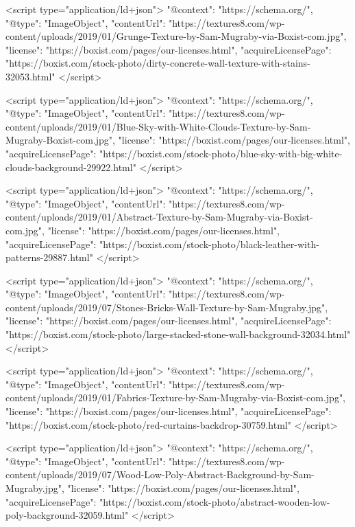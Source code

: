          <script type="application/ld+json">
    {
      "@context": "https://schema.org/",
      "@type": "ImageObject",
      "contentUrl": "https://textures8.com/wp-content/uploads/2019/01/Grunge-Texture-by-Sam-Mugraby-via-Boxist-com.jpg",
      "license": "https://boxist.com/pages/our-licenses.html",
      "acquireLicensePage": "https://boxist.com/stock-photo/dirty-concrete-wall-texture-with-stains-32053.html"
    }
    </script>
    
    
         <script type="application/ld+json">
    {
      "@context": "https://schema.org/",
      "@type": "ImageObject",
      "contentUrl": "https://textures8.com/wp-content/uploads/2019/01/Blue-Sky-with-White-Clouds-Texture-by-Sam-Mugraby-Boxist-com.jpg",
      "license": "https://boxist.com/pages/our-licenses.html",
      "acquireLicensePage": "https://boxist.com/stock-photo/blue-sky-with-big-white-clouds-background-29922.html"
    }
    </script>
    
         <script type="application/ld+json">
    {
      "@context": "https://schema.org/",
      "@type": "ImageObject",
      "contentUrl": "https://textures8.com/wp-content/uploads/2019/01/Abstract-Texture-by-Sam-Mugraby-via-Boxist-com.jpg",
      "license": "https://boxist.com/pages/our-licenses.html",
      "acquireLicensePage": "https://boxist.com/stock-photo/black-leather-with-patterns-29887.html"
    }
    </script>
    
         <script type="application/ld+json">
    {
      "@context": "https://schema.org/",
      "@type": "ImageObject",
      "contentUrl": "https://textures8.com/wp-content/uploads/2019/07/Stones-Bricks-Wall-Texture-by-Sam-Mugraby.jpg",
      "license": "https://boxist.com/pages/our-licenses.html",
      "acquireLicensePage": "https://boxist.com/stock-photo/large-stacked-stone-wall-background-32034.html"
    }
    </script>
    
         <script type="application/ld+json">
    {
      "@context": "https://schema.org/",
      "@type": "ImageObject",
      "contentUrl": "https://textures8.com/wp-content/uploads/2019/01/Fabrics-Texture-by-Sam-Mugraby-via-Boxist-com.jpg",
      "license": "https://boxist.com/pages/our-licenses.html",
      "acquireLicensePage": "https://boxist.com/stock-photo/red-curtains-backdrop-30759.html"
    }
    </script>
    
         <script type="application/ld+json">
    {
      "@context": "https://schema.org/",
      "@type": "ImageObject",
      "contentUrl": "https://textures8.com/wp-content/uploads/2019/07/Wood-Low-Poly-Abstract-Background-by-Sam-Mugraby.jpg",
      "license": "https://boxist.com/pages/our-licenses.html",
      "acquireLicensePage": "https://boxist.com/stock-photo/abstract-wooden-low-poly-background-32059.html"
    }
    </script>
	
